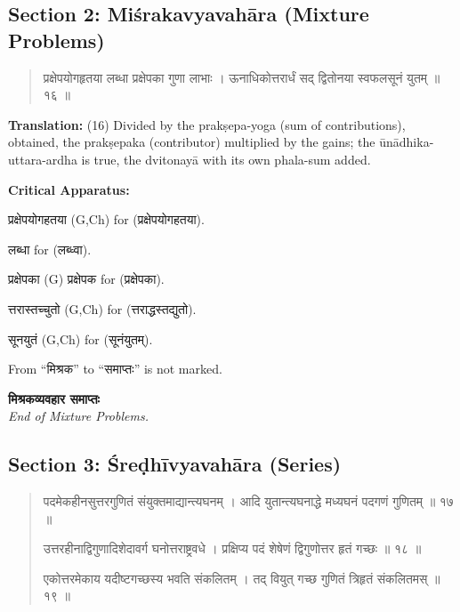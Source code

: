 \documentclass[11pt,a4paper]{article}
\newcommand{\dev}[1]{{\devanagarifont #1}}
\newenvironment{sanskritverse}{%
  \begin{quote}%
  \devanagarifont%
  \setlength{\leftmargin}{2em}%
}{\end{quote}}
\newenvironment{variants}{%
  \small%
  \color{varecolor}%
  \list{}{\leftmargin=2em\itemindent=-1em}%
}{\endlist}
\begin{document}
\newpage


\subsection*{Section 2: Miśrakavyavahāra (Mixture Problems)}

\begin{sanskritverse}
\dev{प्रक्षेपयोगहृतया लब्धा प्रक्षेपका गुणा लाभाः} ।
\dev{ऊनाधिकोत्तरार्धं सद् द्वितोनया स्वफलसूनं युतम् ॥ १६ ॥}
\end{sanskritverse}

\textbf{Translation:} (16) Divided by the prakṣepa-yoga (sum of contributions), 
obtained, the prakṣepaka (contributor) multiplied by the gains; the ūnādhika-uttara-ardha 
is true, the dvitonayā with its own phala-sum added.

\textcolor{varecolor}{\textbf{Critical Apparatus:}}
\begin{variants}
\item[16.1] \dev{प्रक्षेपयोगहतया} (G,Ch) \dev{for} (\dev{प्रक्षेपयोगहतया}).
\item[16.2] \dev{लब्धा} \dev{for} (\dev{लब्ध्वा}).
\item[16.3] \dev{प्रक्षेपका} (G) \dev{प्रक्षेपक} \dev{for} (\dev{प्रक्षेपका}).
\item[16.4] \dev{त्तरास्तच्चुतो} (G,Ch) \dev{for} (\dev{त्तराद्धस्तद्युतो}).
\item[16.5] \dev{सूनयुतं} (G,Ch) \dev{for} (\dev{सूनंयुतम्}).
\item[\dev{वि०}] From ``\dev{मिश्रक}'' to ``\dev{समाप्तः}'' is not marked.
\end{variants}

\vspace{0.3cm}
\begin{center}
\dev{\textbf{मिश्रकव्यवहार समाप्तः}}\\
\textit{End of Mixture Problems.}
\end{center}

\subsection*{Section 3: Śreḍhīvyavahāra (Series)}

\begin{sanskritverse}
\dev{पदमेकहीनसुत्तरगुणितं संयुक्तमाद्यान्त्यघनम्} ।
\dev{आदि युतान्त्यघनाद्धे मध्यघनं पदगणं गुणितम् ॥ १७ ॥}

\dev{उत्तरहीनाद्विगुणादिशेदावर्ग घनोत्तराष्ट्रवधे} ।
\dev{प्रक्षिप्य पदं शेषेणं द्विगुणोत्तर हृतं गच्छः ॥ १८ ॥}

\dev{एकोत्तरमेकाय यदीष्टगच्छस्य भवति संकलितम्} ।
\dev{तद् वियुत् गच्छ गुणितं त्रिहृतं संकलितमस् ॥ १९ ॥}
\end{sanskritverse}
\end{document}
